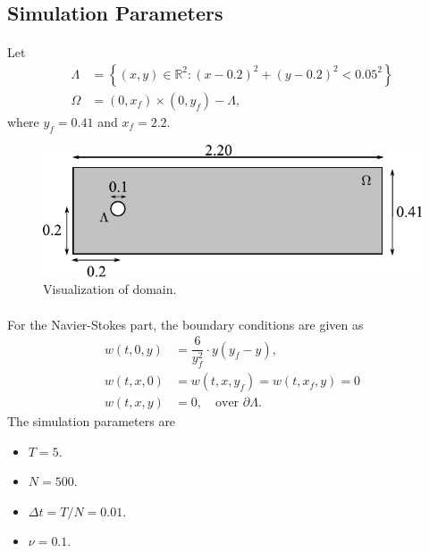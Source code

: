 \documentclass{beamer}
\theoremstyle{definition}
\theoremstyle{remark}
\theoremstyle{example}
\newif\ifinsection
\newif\ifinsubsection
\let\oldsubsection\subsection
\renewcommand{\subsection}{
  \global\insubsectiontrue
  \oldsubsection}
\newcommand {\aframe}[1] {
  \begin{frame}
    \ifinsection\frametitle{\secname}\fi
    \ifinsubsection\framesubtitle{\subsecname}\fi
  #1
  \end{frame}
}
\begin{document}
\subsection{Simulation Parameters}
\aframe{ Let
  \begin{align*}
    \Lambda&=\left\{(x,y)\in\mathbb{R}^2:(x-0.2)^2 + (y-0.2)^2 < 0.05^2\right\}\\
    \Omega&=(0,x_f) \times(0,y_f) - \Lambda,
  \end{align*}
  where $y_f=0.41$ and $x_f=2.2$. \vspace{0.5cm}
  \begin{figure}
    \centering \includegraphics[scale=1]{figs/region.pdf}
    \caption{Visualization of domain.}
  \end{figure}
}

\aframe{For the Navier-Stokes part, the boundary conditions are given as
  \begin{align*}
    w(t, 0, y)& = \dfrac{6}{y_f^2}\cdot y(y_f-y),\\
    w(t, x, 0)& = w(t, x, y_f) = w(t, x_f, y) = 0\\
    w(t, x, y)& = 0,\quad \text{over }\partial\Lambda.
  \end{align*}
  The simulation parameters are
  \begin{itemize}
    \item $T=5$.
    \item $N=500$.
    \item $\Delta t=T/N=0.01$.
    \item $\nu=0.1$.
  \end{itemize}
}
\end{document}
